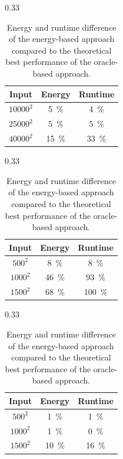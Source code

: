 \documentclass[runningheads]{llncs}
\begin{document}
\begin{table}[ht]
  \centering
  \begin{subtable}{0.33\linewidth}
    \centering
    \begin{tabular}{ccc}\toprule
      Input & Energy & Runtime \\\midrule
      $10000^2$ & \qty{5}{\percent}  & \qty{4}{\percent} \\
      $25000^2$ & \qty{5}{\percent}  & \qty{5}{\percent} \\
      $40000^2$ & \qty{15}{\percent} & \qty{33}{\percent} \\
    \bottomrule\end{tabular}%
    \caption{Nine-point stencil.}%
    \label{tab:oracle-stencil}
  \end{subtable}%
  \begin{subtable}{0.33\linewidth}
    \centering
    \begin{tabular}{ccc}\toprule
      Input & Energy & Runtime \\\midrule
      $ 500^2$ & \qty{8}{\percent}  & \qty{8}{\percent} \\
      $1000^2$ & \qty{46}{\percent} & \qty{93}{\percent} \\
      $1500^2$ & \qty{68}{\percent} & \qty{100}{\percent} \\
    \bottomrule\end{tabular}%
    \caption{Matrix multiplication.}%
    \label{tab:oracle-matmul}
  \end{subtable}%
  \begin{subtable}{0.33\linewidth}
    \centering
    \begin{tabular}{ccc}\toprule
      Input & Energy & Runtime \\\midrule
      $ 500^2$ & \qty{1}{\percent}  & \qty{1}{\percent} \\
      $1000^2$ & \qty{1}{\percent}  & \qty{0}{\percent} \\
      $1500^2$ & \qty{10}{\percent} & \qty{16}{\percent} \\
    \bottomrule\end{tabular}%
    \caption{Rust implementation.}%
    \label{tab:oracle-rust}
  \end{subtable}%
  \caption{Energy and runtime difference of the energy-based approach compared to the theoretical best performance of the oracle-based approach.}%
  \label{fig:oracle}
\end{table}
\end{document}
